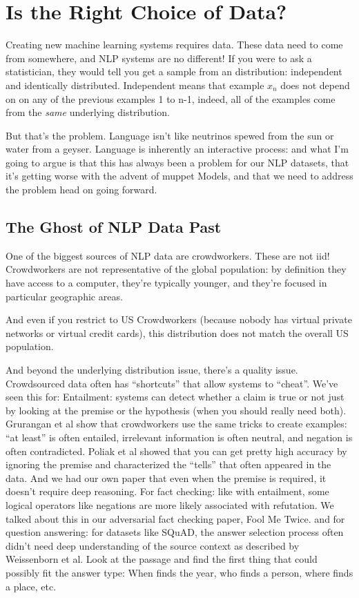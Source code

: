 \section{Is  the Right Choice of Data?}
\label{sec:nq:iid}

Creating new machine learning systems requires data.  These data need to come
from somewhere, and NLP systems are no different!  If you were to ask a
statistician, they would tell you get a sample from an \iid{} distribution:
independent and identically distributed.  Independent means that example
$x_{n}$ does not depend on on any of the previous examples 1 to n-1, indeed,
all of the examples come from the \emph{same} underlying distribution.

But that’s the problem.  Language isn’t like neutrinos spewed from the sun or
water from a geyser.  Language is inherently an interactive process: and what
I’m going to argue is that this has always been a problem for our NLP
datasets, that it’s getting worse with the advent of muppet Models, and that
we need to address the problem head on going forward.

\subsection{The Ghost of NLP Data Past}

One of the biggest sources of NLP data are crowdworkers.  These are not iid!  Crowdworkers are not representative of the global population: by definition they have access to a computer, they’re typically younger, and they’re focused in particular geographic areas.

And even if you restrict to US Crowdworkers (because nobody has virtual private networks or virtual credit cards), this distribution does not match the overall US population.

And beyond the underlying distribution issue, there’s a quality issue.  Crowdsourced data often has “shortcuts” that allow systems to “cheat”.  We’ve seen this for:
Entailment: systems can detect whether a claim is true or not just by looking at the premise or the hypothesis (when you should really need both).  Grurangan et al show that crowdworkers use the same tricks to create examples: “at least” is often entailed, irrelevant information is often neutral, and negation is often contradicted.  Poliak et al showed that you can get pretty high accuracy by ignoring the premise and characterized the “tells” that often appeared in the data. And we had our own paper that even when the premise is required, it doesn’t require deep reasoning.
For fact checking: like with entailment, some logical operators like negations are more likely associated with refutation.  We talked about this in our adversarial fact checking paper, Fool Me Twice.
and for question answering: for datasets like SQuAD, the answer selection process often didn’t need deep understanding of the source context as described by Weissenborn et al.  Look at the passage and find the first thing that could possibly fit the answer type: When finds the year, who finds a person, where finds a place, etc.  

